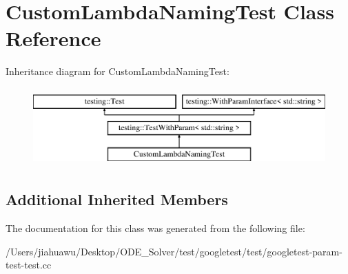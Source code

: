\hypertarget{class_custom_lambda_naming_test}{}\section{Custom\+Lambda\+Naming\+Test Class Reference}
\label{class_custom_lambda_naming_test}
Inheritance diagram for Custom\+Lambda\+Naming\+Test\+:\begin{figure}[H]
\begin{center}
\leavevmode
\includegraphics[height=3.000000cm]{class_custom_lambda_naming_test}
\end{center}
\end{figure}
\subsection*{Additional Inherited Members}


The documentation for this class was generated from the following file\+:\begin{DoxyCompactItemize}
\item 
/\+Users/jiahuawu/\+Desktop/\+O\+D\+E\+\_\+\+Solver/test/googletest/test/googletest-\/param-\/test-\/test.\+cc\end{DoxyCompactItemize}
